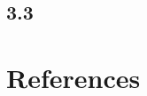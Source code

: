 \clearpage
\section*{3.3}



\chapter{References}

\begin{thebibliography}{9}
	
\end{thebibliography}


\appendix




